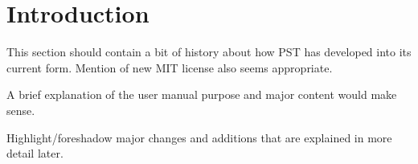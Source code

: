\vspace{2em} %
\chapter*{Introduction}

This section should contain a bit of history about how PST has developed into its current form.
Mention of new MIT license also seems appropriate.


A brief explanation of the user manual purpose and major content would make sense.


Highlight/foreshadow major changes and additions that are explained in more detail later.
